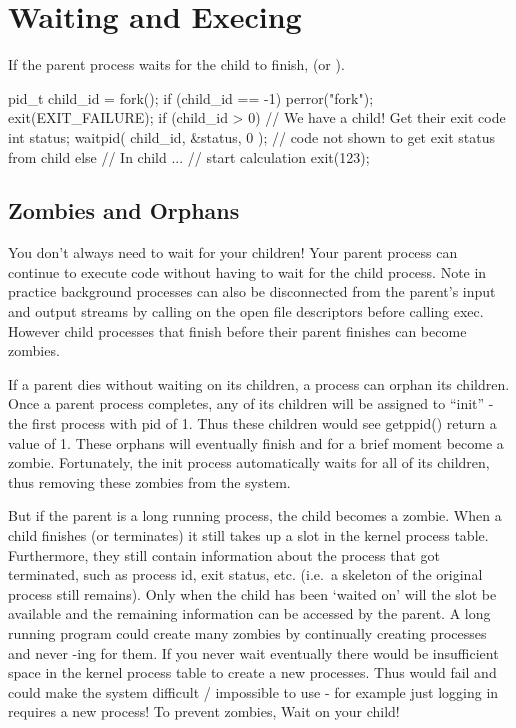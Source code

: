 \section{Waiting and Execing}\label{waiting-and-execing}

If the parent process waits for the child to finish,  (or ).

\begin{code}[language=C]
pid_t child_id = fork();
if (child_id == -1) { perror("fork"); exit(EXIT_FAILURE);}
if (child_id > 0) { 
  // We have a child! Get their exit code
  int status; 
  waitpid( child_id, &status, 0 );
  // code not shown to get exit status from child
} else { // In child ...
  // start calculation
  exit(123);
}
\end{code}

\subsection{Zombies and Orphans}

You don't always need to wait for your children! Your parent process can continue to execute code without having to wait for the child process. Note in practice background processes can also be disconnected from the parent's input and output streams by calling  on the open file descriptors before calling exec. However child processes that finish before their parent finishes can become zombies.

If a parent dies without waiting on its children, a process can orphan its children. Once a parent process completes, any of its children will be assigned to ``init'' - the first process with pid of 1. Thus these children would see getppid() return a value of 1. These orphans will eventually finish and for a brief moment become a zombie. Fortunately, the init process automatically waits for all of its children, thus removing these zombies from the system.

But if the parent is a long running process, the child becomes a zombie. When a child finishes (or terminates) it still takes up a slot in the kernel process table. Furthermore, they still contain information about the process that got terminated, such as process id, exit status, etc. (i.e.~a skeleton of the original process still remains). Only when the child has been `waited on' will the slot be available and the remaining information can be accessed by the parent. A long running program could create many zombies by continually creating processes and never -ing for them. If you never wait eventually there would be insufficient space in the kernel process table to create a new processes. Thus  would fail and could make the system difficult / impossible to use - for example just logging in requires a new process! To prevent zombies, Wait on your child!

